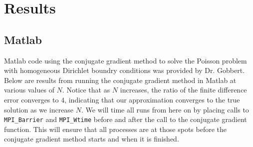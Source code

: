 \documentclass[11pt]{article}
\begin{document}
\section{Results}
\subsection{Matlab}
Matlab code using the conjugate gradient method to solve the Poisson problem with homogeneous Dirichlet boundry conditions was provided by Dr. Gobbert. Below are results from running the conjugate gradient method in Matlab at various values of $N$. Notice that as $N$ increases, the ratio of the finite difference error converges to $4$, indicating that our approximation converges to the true solution as we increase $N$. We will time all runs from here on by placing calls to \texttt{MPI\_Barrier} and \texttt{MPI\_Wtime} before and after the call to the conjugate gradient function. This will ensure that all processes are at those spots before the conjugate gradient method starts and when it is finished.
\begin{table}[!htbp]
\end{table}
\pagebreak
\end{document}
